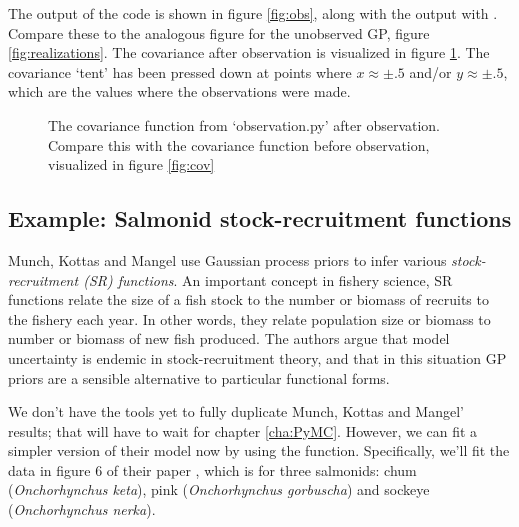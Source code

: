 The output of the code is shown in figure \ref{fig:obs}, along with the output with . Compare these to the analogous figure for the unobserved GP, figure \ref{fig:realizations}. The covariance after observation is visualized in figure \ref{fig:obscov}. The covariance `tent' has been pressed down at points where $x\approx \pm .5$ and/or $y\approx\pm .5$, which are the values where the observations were made.

\begin{figure}
    \centering
    \caption{The covariance function from {\sffamily `observation.py'} after observation. Compare this with the covariance function before observation, visualized in figure \ref{fig:cov} }
    \label{fig:obscov}
\end{figure}

\subsection{Example: Salmonid stock-recruitment functions}\label{sub:MMKregression}
Munch, Kottas and Mangel \cite{mmk} use Gaussian process priors to infer various \emph{stock-recruitment (SR) functions}. An important concept in fishery science, SR functions relate the size of a fish stock to the number or biomass of recruits to the fishery each year. In other words, they relate population size or biomass to number or biomass of new fish produced. The authors argue that model uncertainty is endemic in stock-recruitment theory, and that in this situation GP priors are a sensible alternative to particular functional forms.

We don't have the tools yet to fully duplicate Munch, Kottas and Mangel' results; that will have to wait for chapter \ref{cha:PyMC}. However, we can fit a simpler version of their model now by using the  function. Specifically, we'll fit the data in figure 6 of their paper \cite{mmk}, which is for three salmonids: chum (\emph{Onchorhynchus keta}), pink (\emph{Onchorhynchus gorbuscha}) and sockeye (\emph{Onchorhynchus nerka}).

